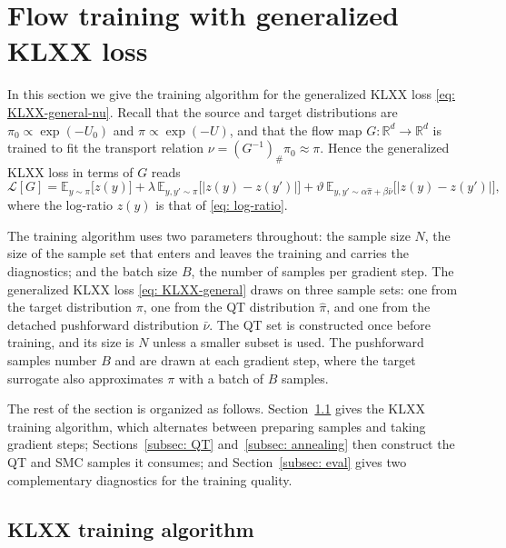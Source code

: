 \documentclass{article}
\begin{document}
\section{Flow training with generalized KLXX loss}
\label{sec: training}

In this section we give the training algorithm for the generalized KLXX loss \eqref{eq: KLXX-general-nu}. Recall that the source and target distributions are $\pi_0\propto \exp(-U_0)$ and $\pi\propto \exp(-U)$, and that the flow map $G:\mathbb R^d\to\mathbb R^d$ is trained to fit the transport relation $\nu=(G^{-1})_{\#}\pi_0\approx\pi$. Hence the generalized KLXX loss in terms of $G$ reads
\begin{equation}
	\mathcal L[G] = \mathbb E_{y\sim\pi}\big[z(y)\big] +  \lambda\, \mathbb E_{y,y'\sim\pi}\big[|z(y)-z(y')|\big] + \vartheta\, \mathbb E_{y,y'\sim \alpha\hat\pi+\beta\bar\nu}\big[|z(y)-z(y')|\big],
	\label{eq: KLXX-general}
\end{equation}
where the log-ratio $z(y)$ is that of \eqref{eq: log-ratio}.

The training algorithm uses two parameters throughout: the sample size $N$, the size of the sample set that enters and leaves the training and carries the diagnostics; and the batch size $B$, the number of samples per gradient step.
The generalized KLXX loss \eqref{eq: KLXX-general} draws on three sample sets: one from the target distribution $\pi$, one from the QT distribution $\hat\pi$, and one from the detached pushforward distribution $\bar\nu$. The QT set is constructed once before training, and its size is $N$ unless a smaller subset is used. The pushforward samples number $B$ and are drawn at each gradient step, where the target surrogate also approximates $\pi$ with a batch of $B$ samples.

The rest of the section is organized as follows. Section~\ref{subsec: training-algorithm} gives the KLXX training algorithm, which alternates between preparing samples and taking gradient steps; Sections~\ref{subsec: QT} and~\ref{subsec: annealing} then construct the QT and SMC samples it consumes; and Section~\ref{subsec: eval} gives two complementary diagnostics for the training quality.

\subsection{KLXX training algorithm}
\label{subsec: training-algorithm}
\end{document}
